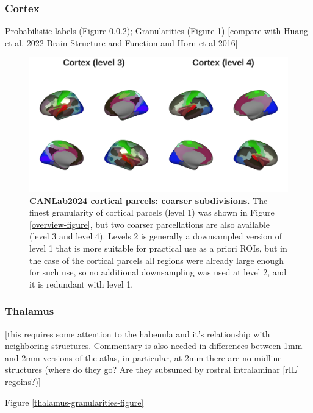 \documentclass[10pt,letterpaper]{article}
\begin{document}
\subsubsection{Cortex} 
Probabilistic labels (Figure \ref{}); Granularities (Figure \ref{cortex-granularities-figure})
[compare with Huang et al. 2022 Brain Structure and Function and Horn et al 2016]


\begin{figure}[t]
\centering
\includegraphics[width=\linewidth]{images/cortex_label_granularities.png}
\caption{
{\bf
CANLab2024 cortical parcels: coarser subdivisions.} 
The finest granularity of cortical parcels (level 1) was shown in Figure \ref{overview-figure}, but two coarser parcellations are also available (level 3 and level 4). Levels 2 is generally a downsampled version of level 1 that is more suitable for practical use as a priori ROIs, but in the case of the cortical parcels all regions were already large enough for such use, so no additional downsampling was used at level 2, and it is redundant with level 1.}
\label{cortex-granularities-figure}
\end{figure}

\subsubsection{Thalamus}
[this requires some attention to the habenula and it's relationship with neighboring structures. Commentary is also needed in differences between 1mm and 2mm versions of the atlas, in particular, at 2mm there are no midline structures (where do they go? Are they subsumed by rostral intralaminar [rIL] regoins?)]

Figure \ref{thalamus-granularities-figure}
\end{document}
